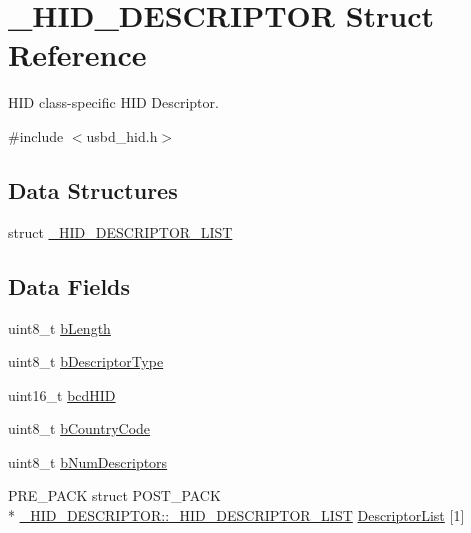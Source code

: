 \hypertarget{struct__HID__DESCRIPTOR}{\section{\-\_\-\-H\-I\-D\-\_\-\-D\-E\-S\-C\-R\-I\-P\-T\-O\-R Struct Reference}
\label{struct__HID__DESCRIPTOR}
}


H\-I\-D class-\/specific H\-I\-D Descriptor.  




{\ttfamily \#include $<$usbd\-\_\-hid.\-h$>$}

\subsection*{Data Structures}
\begin{DoxyCompactItemize}
\item 
struct \hyperlink{struct__HID__DESCRIPTOR_1_1__HID__DESCRIPTOR__LIST}{\-\_\-\-H\-I\-D\-\_\-\-D\-E\-S\-C\-R\-I\-P\-T\-O\-R\-\_\-\-L\-I\-S\-T}
\end{DoxyCompactItemize}
\subsection*{Data Fields}
\begin{DoxyCompactItemize}
\item 
uint8\-\_\-t \hyperlink{struct__HID__DESCRIPTOR_abec52caed8ae7c6265e6aa9fccfec729}{b\-Length}
\item 
uint8\-\_\-t \hyperlink{struct__HID__DESCRIPTOR_a212247b88d45fcb74da281192f9d4d02}{b\-Descriptor\-Type}
\item 
uint16\-\_\-t \hyperlink{struct__HID__DESCRIPTOR_acb02b2afae4c474d60d3ce5ea90d6b3d}{bcd\-H\-I\-D}
\item 
uint8\-\_\-t \hyperlink{struct__HID__DESCRIPTOR_a6d494d09bf37ea067da3a089f0c966ba}{b\-Country\-Code}
\item 
uint8\-\_\-t \hyperlink{struct__HID__DESCRIPTOR_a9613890e6d0ae78428807a72beb64d74}{b\-Num\-Descriptors}
\item 
P\-R\-E\-\_\-\-P\-A\-C\-K struct P\-O\-S\-T\-\_\-\-P\-A\-C\-K \\*
\hyperlink{struct__HID__DESCRIPTOR_1_1__HID__DESCRIPTOR__LIST}{\-\_\-\-H\-I\-D\-\_\-\-D\-E\-S\-C\-R\-I\-P\-T\-O\-R\-::\-\_\-\-H\-I\-D\-\_\-\-D\-E\-S\-C\-R\-I\-P\-T\-O\-R\-\_\-\-L\-I\-S\-T} \hyperlink{struct__HID__DESCRIPTOR_ab147b0fb12a4d62db59bb05846a48161}{Descriptor\-List} \mbox{[}1\mbox{]}
\end{DoxyCompactItemize}


